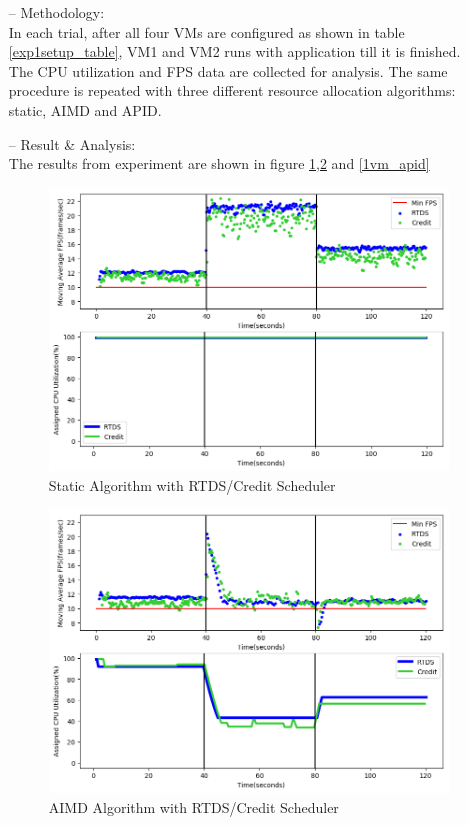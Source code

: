 \begin{itemize}
\item[--] Methodology:\\
In each trial, after all four VMs are configured as shown in table \ref{exp1setup_table}, VM1 and VM2 runs with application till it is finished. The CPU utilization and FPS data are collected for analysis. The same procedure is repeated with three different resource allocation algorithms: static, AIMD and APID.

\item[--] Result \& Analysis:\\
The results from experiment are shown in figure \ref{1vm_static},\ref{1vm_aimd} and \ref{1vm_apid}


\begin{figure}[h!]
\centering
\includegraphics[width=1\linewidth]{images/1vm_static}
\caption{Static Algorithm with RTDS/Credit Scheduler}
\label{1vm_static}
\end{figure}

\begin{figure}[h!]
\centering
\includegraphics[width=1\linewidth]{images/1vm_aimd}
\caption{AIMD Algorithm with RTDS/Credit Scheduler}
\label{1vm_aimd}
\end{figure}


\end{itemize}
